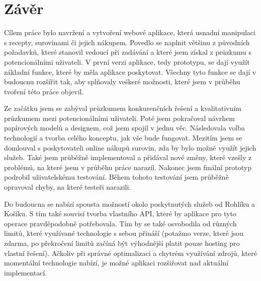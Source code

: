 
\chapter{Závěr}


Cílem práce bylo navržení a vytvoření webové aplikace, která usnadní manipulaci s recepty, surovinami či jejich nákupem.
Povedlo se naplnit většinu z původních požadavků, které stanovil vedoucí při zadávání a které jsem získal z průzkumu s potencionálními
uživateli. V první verzi aplikace, tedy prototypu, se dají využít základní funkce, které by měla aplikace poskytovat. Všechny tyto
funkce se dají v budoucnu rozšířit tak, aby splňovaly veškeré možnosti, které jsem v průběhu tvoření této práce objevil.

Ze začátku jsem se zabýval průzkumem konkurenčních řešení a kvalitativním průzkumem mezi potencionálními uživateli. Poté
jsem pokračoval návrhem papírových modelů a designem, což jsem spojil v jednu věc. Následovala volba technologií a tvorba
celého konceptu, jak vše bude fungovat. Mezitím jsem se domlouval s poskytovateli online nákupů surovin, zda by bylo možné
využít jejich služeb. Také jsem průběžně implementoval a přidával nové změny, které vzešly z problémů, na které jsem v průběhu
práce narazil. Nakonec jsem finální prototyp podrobil uživatelskému testování. Během tohoto testování jsem průběžně opravoval
chyby, na které testeři narazili.

Do budoucna se nabízí spousta možností okolo poskytnutých služeb od Rohlíku a Košíku. S tím také souvisí tvorba vlastního
API, které by aplikace pro tyto operace pravděpodobně potřebovala. Tím by se také osvobodila od různých limitů, které využívané
technologie s sebou přináší (potažmo verze, které jsou zdarma, po překročení limitů začíná být výhodnější platit pouze hosting
pro vlastní řešení). Ačkoliv při správné optimalizaci a chytrém využívání zdrojů, které momentální technologie nabízí, je možné
aplikaci rozšiřovat nad aktuální implementací.
